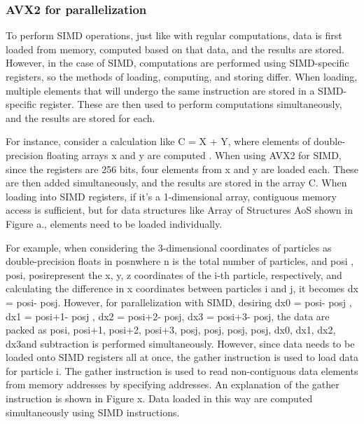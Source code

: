 \documentclass[ams, a4j]{U-AizuGT}
\begin{document}
\subsubsection{AVX2 for parallelization}
To perform SIMD operations, just like with regular computations, data is first loaded from memory, computed based on that data,
and the results are stored. However, in the case of SIMD, computations are performed using SIMD-specific registers, so the 
methods of loading, computing, and storing differ. When loading, multiple elements that will undergo the same instruction are
stored in a SIMD-specific register. These are then used to perform computations simultaneously, and the results are stored for
each. 


For instance, consider a calculation like C = X + Y, where elements of double-precision floating arrays x and y are computed
. When using AVX2 for SIMD, since the registers are 256 bits, four elements from x and y are loaded each. These are then added 
simultaneously, and the results are stored in the array C. When loading into SIMD registers, if it's a 1-dimensional array, 
contiguous memory access is sufficient, but for data structures like Array of Structures \lparen AoS \rparen shown in Figure a., elements need
to be loaded individually. 


For example, when considering the 3-dimensional coordinates of particles as double-precision floats 
in pos\lbrack n\rbrack {}\rbrack  \lparen where n is the total number of particles, and pos\lbrack i \rbrack {}\rbrack , pos\lbrack i\rbrack {}\rbrack , 
pos\lbrack i\rbrack {}\rbrack  represent the x, y, z coordinates 
of the i-th particle, respectively\rparen, and calculating the difference in x coordinates between particles i and j, it becomes dx = 
pos\lbrack i\rbrack {}\rbrack  - pos\lbrack j\rbrack {}\rbrack . However, for parallelization with SIMD, desiring dx0 = pos\lbrack i\rbrack {}\rbrack  - pos\lbrack j \rbrack {}\rbrack , dx1 = pos\lbrack i+1\rbrack {}\rbrack  - pos\lbrack j\rbrack {}\rbrack 
, dx2 = pos\lbrack i+2\rbrack {}\rbrack  - pos\lbrack j\rbrack {}\rbrack , dx3 = pos\lbrack i+3\rbrack {}\rbrack  - pos\lbrack j\rbrack {}\rbrack , 
the data are packed as \lparen pos\lbrack i\rbrack {}\rbrack , pos\lbrack i+1\rbrack {}\rbrack , pos\lbrack i+2\rbrack {}\rbrack , pos\lbrack  i+3\rbrack {}\rbrack \rparen,
\lparen pos\lbrack  j\rbrack {}\rbrack , pos\lbrack  j\rbrack {}\rbrack , pos\lbrack  j\rbrack {}\rbrack , pos\lbrack  j\rbrack {}\rparen, \lparen dx0, dx1, dx2, dx3\rparen and subtraction is performed simultaneously. However, since data needs
to be loaded onto SIMD registers all at once, the gather instruction is used to load data for particle i. The gather instruction is used
to read non-contiguous data elements from memory addresses by specifying addresses. An explanation of the gather instruction is shown in 
Figure x. Data loaded in this way are computed simultaneously using SIMD instructions. 
\end{document}
